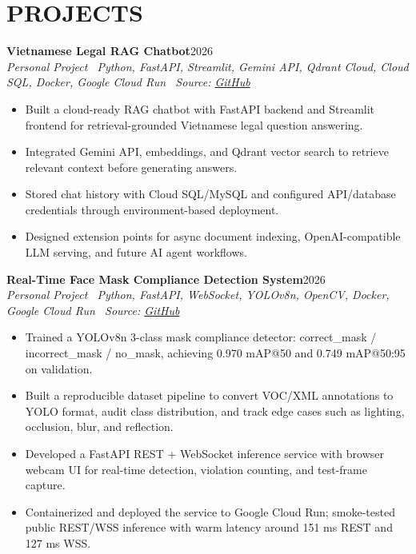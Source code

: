 \documentclass[10pt,a4paper]{article}
\newenvironment{cvitems}{%
    \begin{itemize}[leftmargin=1.2em,itemsep=0pt,topsep=1pt,parsep=0pt]
}{%
    \end{itemize}
}
\newcommand{\entryhead}[2]{%
    \noindent\textbf{#1}\hfill #2\\[-2pt]
}
\newcommand{\entrysub}[1]{%
    \noindent\textit{#1}\\[-1pt]
}
\begin{document}
\section{PROJECTS}
\entryhead{Vietnamese Legal RAG Chatbot}{2026}
\entrysub{Personal Project \textbar\ Python, FastAPI, Streamlit, Gemini API, Qdrant Cloud, Cloud SQL, Docker, Google Cloud Run \textbar\ Source: \href{https://github.com/NguyenKhacBao564/legal_RaG_Chatbot_VietNamese-System}{GitHub}}
\begin{cvitems}
    \item Built a cloud-ready RAG chatbot with FastAPI backend and Streamlit frontend for retrieval-grounded Vietnamese legal question answering.
    \item Integrated Gemini API, embeddings, and Qdrant vector search to retrieve relevant context before generating answers.
    \item Stored chat history with Cloud SQL/MySQL and configured API/database credentials through environment-based deployment.
    \item Designed extension points for async document indexing, OpenAI-compatible LLM serving, and future AI agent workflows.
\end{cvitems}

\entryhead{Real-Time Face Mask Compliance Detection System}{2026}
\entrysub{Personal Project \textbar\ Python, FastAPI, WebSocket, YOLOv8n, OpenCV, Docker, Google Cloud Run \textbar\ Source: \href{https://github.com/NguyenKhacBao564/Real-Time-Face-Mask-Compliance-Detection-System}{GitHub}}
\begin{cvitems}
    \item Trained a YOLOv8n 3-class mask compliance detector: correct\_mask / incorrect\_mask / no\_mask, achieving 0.970 mAP@50 and 0.749 mAP@50:95 on validation.
    \item Built a reproducible dataset pipeline to convert VOC/XML annotations to YOLO format, audit class distribution, and track edge cases such as lighting, occlusion, blur, and reflection.
    \item Developed a FastAPI REST + WebSocket inference service with browser webcam UI for real-time detection, violation counting, and test-frame capture.
    \item Containerized and deployed the service to Google Cloud Run; smoke-tested public REST/WSS inference with warm latency around 151 ms REST and 127 ms WSS.
\end{cvitems}
\end{document}
